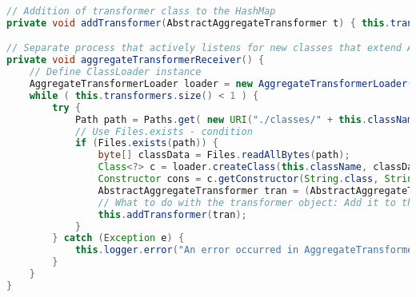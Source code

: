 \begin{lstlisting}[language=Java, caption={Metoden \emph{addTransformer}, og metoden \emph{aggregateTransformerReceiver}, som kjøres i en separat tråd idet \textbf{Migrator}-konstruktøren kalles.}]
// Addition of transformer class to the HashMap
private void addTransformer(AbstractAggregateTransformer t) { this.transformers.put(t.getAppVersion(), t); }

// Separate process that actively listens for new classes that extend AAT
private void aggregateTransformerReceiver() {
    // Define ClassLoader instance
    AggregateTransformerLoader loader = new AggregateTransformerLoader();
    while ( this.transformers.size() < 1 ) {
        try {
            Path path = Paths.get( new URI("./classes/" + this.className + ".class"));
            // Use Files.exists - condition
            if (Files.exists(path)) {
                byte[] classData = Files.readAllBytes(path);
                Class<?> c = loader.createClass(this.className, classData);
                Constructor cons = c.getConstructor(String.class, String.class);
                AbstractAggregateTransformer tran = (AbstractAggregateTransformer) cons.newInstance( "x", "y" );
                // What to do with the transformer object: Add it to the AAT list
                this.addTransformer(tran);
            }
        } catch (Exception e) {
            this.logger.error("An error occurred in AggregateTransformerReceiver ", e);
        }
    }
}
\end{lstlisting}

